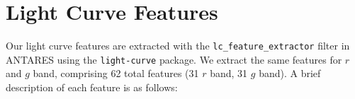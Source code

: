 \documentclass[twocolumn]{aastex63}
\begin{document}
\section{Light Curve Features}
\label{appx:lc_features}


\renewcommand{\thefigure}{A.\arabic{figure}}
\setcounter{figure}{0}
\renewcommand{\thetable}{A.\arabic{table}} \setcounter{table}{0}

Our light curve features are extracted with the \texttt{lc\_feature\_extractor} filter in ANTARES using the \texttt{light-curve} package. We extract the same features for $r$ and $g$ band, comprising 62 total features (31 $r$ band, 31 $g$ band). A brief description of each feature is as follows:
\end{document}
